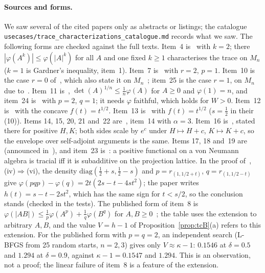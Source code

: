 \paragraph{Sources and forms.} We saw several of the cited papers only as abstracts or listings; the catalogue
\texttt{usecases/trace\_characterizations\_catalogue.md} records what we saw. The following forms are checked against
the full texts. Item~4 is~\cite[Theorem~1]{petz1988} with $k=2$; there $|\varphi(A^k)|\le\varphi(|A|^k)$ for all $A$ and
one fixed $k\ge1$ characterises the trace on $M_n$ ($k=1$ is Gardner's inequality, item~1). Item~7
is~\cite[Lemma~2]{bikchentaev2011pb} with $r=2$, $p=1$. Item~10 is the case $r=0$ of~\cite[Theorems~4, 5]{hoa2010},
which also state it on $M_n$~\cite{bikchentaev2007mono,sano2006}; item~25 is the case $r=1$, on $M_n$ due
to~\cite[Theorem~6]{hoa2007}. Item~11 is~\cite[Theorem~3(iii)]{bikchentaev2020det}, $\det(A)^{1/n}\le\frac1n\varphi(A)$
for $A\ge0$ and $\varphi(1)=n$, and item~24 is~\cite[Theorem~3(vii)]{bikchentaev2020det} with $p=2$, $q=1$; it needs
$\varphi$ faithful, which holds for $W>0$. Item~12 is~\cite[Corollary~1]{tikhonov2005} with the concave
$f(t)=t^{1/2}$. Item~13 is~\cite[Lemma~3.1 and Remark~4]{hoa2013} with $f(t)=t^{1/2}$ ($s=\frac12$ in their (10)).
Items 14, 15, 20, 21 and~22 are~\cite[Theorem~2(i), (iv), (v), (vi), (vii)]{bikchentaev2011mn}, item~14 with
$\alpha=3$. Item~16 is~\cite[Lemma~1]{bikchentaev2011pb}, stated there for positive $H,K$; both sides scale by $e^c$
under $H\mapsto H+c$, $K\mapsto K+c$, so the envelope over self-adjoint arguments is the same. Items 17, 18 and~19
are~\cite[Theorem~3.4(iv), (v), (iii)]{bikchentaev2010smj} (announced in~\cite{bikchentaev2009rm}), and item~23
is~\cite[Theorem~4]{petz1988}: a positive functional on a von Neumann algebra is tracial iff it is subadditive on the
projection lattice. In the proof of~\cite[Theorem~3.4]{bikchentaev2010smj}, (iv)$\Rightarrow$(vi), the density
$\mathrm{diag}(\frac12+s,\frac12-s)$ and $p=r_{(1,1/2+t)}$, $q=r_{(1,1/2-t)}$ give
$\varphi(pqp)-\varphi(q)=2t(2s-t-4st^2)$; the paper writes $h(t)=s-t-2st^2$, which has the same sign for $t<s/2$, so
the conclusion stands (checked in the tests). The published form of item~8 is
$\varphi(|AB|)\le\frac1p\varphi(A^p)+\frac1q\varphi(B^q)$ for $A,B\ge0$~\cite{bikchentaev2005young}; the table uses the
extension to arbitrary $A,B$, and the value $V=h-1$ of Proposition~\ref{prop:tcB}(a) refers to this extension. For
the published form with $p=q=2$, an independent search (L-BFGS from 25 random starts, $n=2,3$) gives only
$V\approx\kappa-1$: $0.1546$ at $\delta=0.5$ and $1.294$ at $\delta=0.9$, against $\kappa-1=0.1547$ and $1.294$. This
is an observation, not a proof; the linear failure of item~8 is a feature of the extension.

